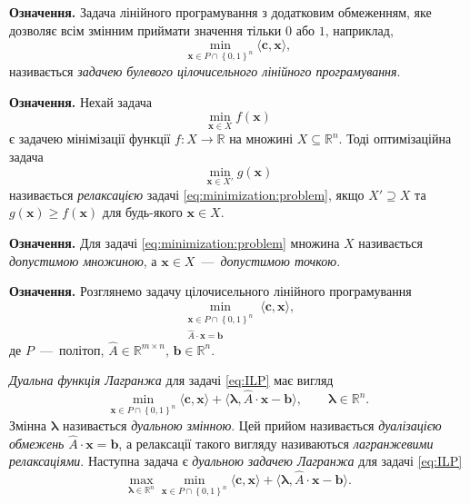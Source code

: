 \textbf{Означення.}
Задача лінійного програмування з додатковим обмеженням,
яке дозволяє всім змінним приймати значення тільки $0$ або $1$,
наприклад,
\begin{equation*}
    \min \limits_{\pmb{x} \in P \cap \left\{ 0, 1 \right\}^n}
    \langle \pmb{c}, \pmb{x} \rangle,
\end{equation*}
називається \textit{задачею булевого цілочисельного лінійного програмування}.

\textbf{Означення.}
Нехай задача
\begin{equation} \label{eq:minimization:problem}
    \min_{\pmb{x} \in X} f \left( \pmb{x} \right)
\end{equation}
є задачею мінімізації функції $f: X \to \mathbb{R}$ на множині
$X \subseteq \mathbb{R}^n$.
Тоді оптимізаційна задача
\begin{equation*}
    \min_{\pmb{x} \in X'} g \left(\pmb{x} \right)
\end{equation*}
називається \textit{релаксацією} задачі \eqref{eq:minimization:problem},
якщо $X' \supseteq X$ та $g \left( \pmb{x} \right) \ge f \left( \pmb{x} \right)$
для будь-якого $\pmb{x} \in X$.

\textbf{Означення.}
Для задачі \eqref{eq:minimization:problem} множина $X$ називається
\textit{допустимою множиною}, а $\pmb{x} \in X$~---~\textit{допустимою точкою}.

\textbf{Означення.}
Розглянемо задачу цілочисельного лінійного програмування
\begin{equation} \label{eq:ILP}
    \min \limits_{\substack{\pmb{x} \in P \cap \left\{ 0, 1\right\}^n \\
                  \hat{A} \cdot \pmb{x} = \pmb{b}}}
        \langle \pmb{c}, \pmb{x} \rangle,
\end{equation}
де $P$~---~політоп, $\hat{A} \in \mathbb{R}^{m \times n}$,
$\pmb{b} \in \mathbb{R}^n$.

\textit{Дуальна функція Лагранжа} для задачі \eqref{eq:ILP} має вигляд
\begin{equation} \label{eq:dualization}
    \min \limits_{\pmb{x} \in P \cap \left\{ 0, 1 \right\}^n}
        \langle \pmb{c}, \pmb{x} \rangle +
        \langle \pmb{\lambda}, \hat{A} \cdot \pmb{x} - \pmb{b} \rangle, \qquad
    \pmb{\lambda} \in \mathbb{R}^n.
\end{equation}
Змінна $\pmb{\lambda}$ називається \textit{дуальною змінною}.
Цей прийом називається \textit{дуалізацією обмежень}
$\hat{A} \cdot \pmb{x} = \pmb{b}$,
а релаксації такого вигляду називаються \textit{лагранжевими релаксаціями}.
Наступна задача є \textit{дуальною задачею Лагранжа} для задачі \eqref{eq:ILP}
\begin{equation} \label{eq:lagrange:dual:problem}
    \max \limits_{\pmb{\lambda} \in \mathbb{R}^n}
        \min \limits_{\pmb{x} \in P \cap \left\{ 0, 1 \right\}^n}
            \langle \pmb{c}, \pmb{x} \rangle +
            \langle \pmb{\lambda}, \hat{A} \cdot \pmb{x} - \pmb{b} \rangle.
\end{equation}

